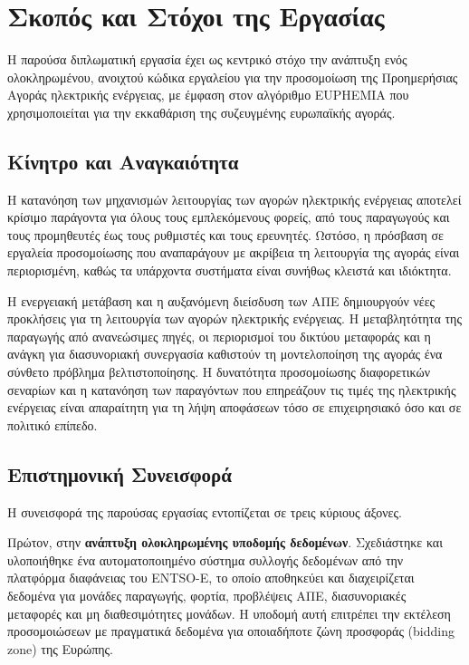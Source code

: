 \section{Σκοπός και Στόχοι της Εργασίας}
\label{sec:objectives}

Η παρούσα διπλωματική εργασία έχει ως κεντρικό στόχο την ανάπτυξη ενός ολοκληρωμένου, ανοιχτού κώδικα εργαλείου για την προσομοίωση της Προημερήσιας Αγοράς ηλεκτρικής ενέργειας, με έμφαση στον αλγόριθμο EUPHEMIA που χρησιμοποιείται για την εκκαθάριση της συζευγμένης ευρωπαϊκής αγοράς.

\subsection{Κίνητρο και Αναγκαιότητα}
\label{subsec:motivation}

Η κατανόηση των μηχανισμών λειτουργίας των αγορών ηλεκτρικής ενέργειας αποτελεί κρίσιμο παράγοντα για όλους τους εμπλεκόμενους φορείς, από τους παραγωγούς και τους προμηθευτές έως τους ρυθμιστές και τους ερευνητές. Ωστόσο, η πρόσβαση σε εργαλεία προσομοίωσης που αναπαράγουν με ακρίβεια τη λειτουργία της αγοράς είναι περιορισμένη, καθώς τα υπάρχοντα συστήματα είναι συνήθως κλειστά και ιδιόκτητα.

Η ενεργειακή μετάβαση και η αυξανόμενη διείσδυση των ΑΠΕ δημιουργούν νέες προκλήσεις για τη λειτουργία των αγορών ηλεκτρικής ενέργειας. Η μεταβλητότητα της παραγωγής από ανανεώσιμες πηγές, οι περιορισμοί του δικτύου μεταφοράς και η ανάγκη για διασυνοριακή συνεργασία καθιστούν τη μοντελοποίηση της αγοράς ένα σύνθετο πρόβλημα βελτιστοποίησης. Η δυνατότητα προσομοίωσης διαφορετικών σεναρίων και η κατανόηση των παραγόντων που επηρεάζουν τις τιμές της ηλεκτρικής ενέργειας είναι απαραίτητη για τη λήψη αποφάσεων τόσο σε επιχειρησιακό όσο και σε πολιτικό επίπεδο.

\subsection{Επιστημονική Συνεισφορά}
\label{subsec:contribution}

Η συνεισφορά της παρούσας εργασίας εντοπίζεται σε τρεις κύριους άξονες.

Πρώτον, στην \textbf{ανάπτυξη ολοκληρωμένης υποδομής δεδομένων}. Σχεδιάστηκε και υλοποιήθηκε ένα αυτοματοποιημένο σύστημα συλλογής δεδομένων από την πλατφόρμα διαφάνειας του ENTSO-E, το οποίο αποθηκεύει και διαχειρίζεται δεδομένα για μονάδες παραγωγής, φορτία, προβλέψεις ΑΠΕ, διασυνοριακές μεταφορές και μη διαθεσιμότητες μονάδων. Η υποδομή αυτή επιτρέπει την εκτέλεση προσομοιώσεων με πραγματικά δεδομένα για οποιαδήποτε ζώνη προσφοράς (bidding zone) της Ευρώπης.

